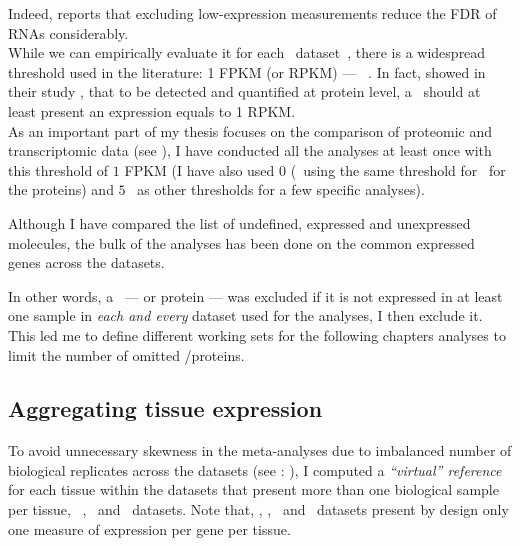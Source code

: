 \begin{itemize}
\begin{itemize}
                Indeed, \citet{seqcmaqc} reports that
                excluding low-expression measurements reduce the \gls{FDR}
                of \glspl{RNA} considerably.\\
                While we can empirically evaluate it for each \Rnaseq\
                dataset~,
                there is a widespread threshold used in the literature:
                1 \gls{FPKM} (or \gls{RPKM}) --- \eg{}~\citet{Uhlen2014,Uhlen2015}.
                In fact, \citet{Hebenstreit:2011} showed in their study
                \paper{\citetitle{Hebenstreit:2011}},
                that to be detected and quantified at protein level,
                a \mRNA\ should at least present an expression equals to 1 \gls{RPKM}.\\
                As an important part of my thesis focuses on
                the comparison of proteomic and transcriptomic data (see ),
                I have conducted all the analyses at least once with this threshold of $1$ \gls{FPKM}
                (I have also used $0$ (\ie\ using the same threshold for \mRNAs\
                for the proteins) and $5$ \FPKM\ as other thresholds
                for a few specific analyses).
        \end{itemize}
\end{itemize}

\vspace{-0.1in}
Although I have compared the list of
undefined, expressed and unexpressed molecules,
the bulk of the analyses has been done on the common expressed genes across
the datasets.

In other words, a \mRNA\ --- or protein --- was excluded
if it is not expressed in at least
one sample in \emph{each and every} dataset used for the analyses,
I then exclude it.
This led me to define different working sets for the following chapters analyses
to limit the number of omitted \mRNAs/proteins.

\subsection{Aggregating tissue expression}\label{subsec:averagedTissue}
\vspace{-0.15in}
To avoid unnecessary skewness in the meta-analyses due to
imbalanced number of
biological replicates across the datasets (see :
),
I computed a \emph{\enquote{virtual} reference} for each tissue
within the datasets that present more than one biological sample per tissue,
\ie\ \vt, \uhlen\ and \gtex\ datasets.
Note that, \castle, \cutler, \kuster\ and \pandey\ datasets present by design only
one measure of expression per gene per tissue.


